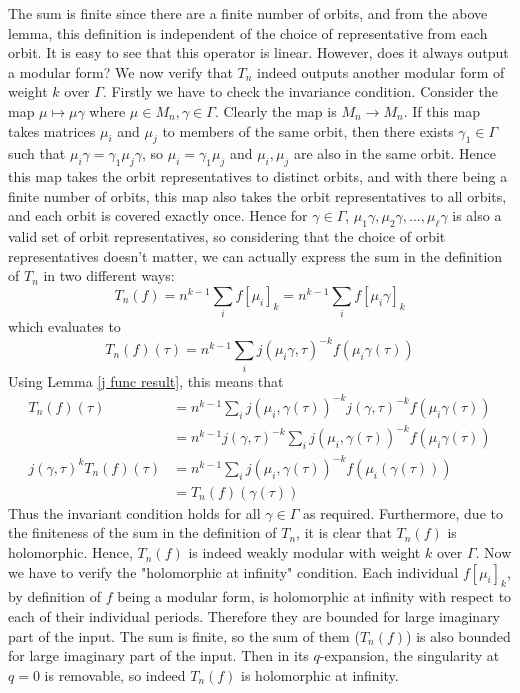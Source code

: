 \documentclass{article}
\theoremstyle{definition}
\theoremstyle{definition}
\theoremstyle{definition}
\begin{document}
The sum is finite since there are a finite number of orbits, and from the above lemma, this definition is independent of the choice of representative from each orbit.
\newline\newline
It is easy to see that this operator is linear. However, does it always output a modular form? We now verify that $T_n$ indeed outputs another modular form of weight $k$ over $\Gamma$.
\newline\newline
Firstly we have to check the invariance condition. Consider the map $\mu\mapsto\mu\gamma$ where $\mu\in M_n, \gamma\in\Gamma$. Clearly the map is $M_n\rightarrow M_n$. If this map takes matrices $\mu_i$ and $\mu_j$ to members of the same orbit, then there exists $\gamma_1\in\Gamma$ such that $\mu_i\gamma=\gamma_1\mu_j\gamma$, so $\mu_i=\gamma_1\mu_j$ and $\mu_i,\mu_j$ are also in the same orbit. Hence this map takes the orbit representatives to distinct orbits, and with there being a finite number of orbits, this map also takes the orbit representatives to all orbits, and each orbit is covered exactly once. Hence for $\gamma\in\Gamma$, $\mu_1\gamma,\mu_2\gamma,\dots,\mu_\ell\gamma$ is also a valid set of orbit representatives, so considering that the choice of orbit representatives doesn't matter, we can actually express the sum in the definition of $T_n$ in two different ways:
$$T_n(f)=n^{k-1}\sum_if[\mu_i]_k=n^{k-1}\sum_if[\mu_i\gamma]_k$$
which evaluates to
$$T_n(f)(\tau)=n^{k-1}\sum_ij(\mu_i\gamma,\tau)^{-k}f(\mu_i\gamma(\tau))$$
Using Lemma \ref{j func result}, this means that
\begin{align*}
T_n(f)(\tau)&=n^{k-1}\sum_ij(\mu_i,\gamma(\tau))^{-k}j(\gamma,\tau)^{-k}f(\mu_i\gamma(\tau))\\
&=n^{k-1}j(\gamma,\tau)^{-k}\sum_ij(\mu_i,\gamma(\tau))^{-k}f(\mu_i\gamma(\tau))\\
j(\gamma,\tau)^kT_n(f)(\tau)&=n^{k-1}\sum_ij(\mu_i,\gamma(\tau))^{-k}f(\mu_i(\gamma(\tau)))\\
&=T_n(f)(\gamma(\tau))
\end{align*}
Thus the invariant condition holds for all $\gamma\in\Gamma$ as required. Furthermore, due to the finiteness of the sum in the definition of $T_n$, it is clear that $T_n(f)$ is holomorphic. Hence, $T_n(f)$ is indeed weakly modular with weight $k$ over $\Gamma$.
\newline\newline
Now we have to verify the "holomorphic at infinity" condition. Each individual $f[\mu_i]_k$, by definition of $f$ being a modular form, is holomorphic at infinity with respect to each of their individual periods. Therefore they are bounded for large imaginary part of the input. The sum is finite, so the sum of them ($T_n(f)$) is also bounded for large imaginary part of the input. Then in its $q$-expansion, the singularity at $q=0$ is removable, so indeed $T_n(f)$ is holomorphic at infinity.
\end{document}
